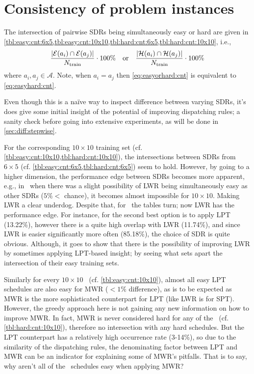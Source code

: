 \section{Consistency of problem instances}
The intersection of pairwise SDRs being simultaneously easy or hard are given in \cref{tbl:easy:cnt:6x5,tbl:easy:cnt:10x10,tbl:hard:cnt:6x5,tbl:hard:cnt:10x10}, i.e., 
\begin{equation}\label{eq:easyorhard:cnt}
	\frac{\abs{\mathcal{E}(a_i)\cap \mathcal{E}(a_j) }}{N_{\text{train}}} \cdot 100\%
	\quad \text{or} \quad 
	\frac{\abs{\mathcal{H}(a_i)\cap \mathcal{H}(a_j)}}{N_{\text{train}}}\cdot 100\%
\end{equation}
where $a_i,a_j\in\mathcal{A}$. Note, when $a_i=a_j$ then \cref{eq:easyorhard:cnt} is equivalent to \cref{eq:easyhard:cnt}.

Even though this is a na\"ive way to inspect difference between varying SDRs, it's does give some initial insight of the potential of improving dispatching rules; a sanity check before going into extensive experiments, as will be done in \cref{sec:diff:stepwise}.

For the corresponding $10\times10$ training set (cf. \cref{tbl:easy:cnt:10x10,tbl:hard:cnt:10x10}), the intersections between SDRs from $6\times5$ (cf. \cref{tbl:easy:cnt:6x5,tbl:hard:cnt:6x5}) seem to hold. 
However, by going to a higher dimension, the performance edge between SDRs becomes more apparent, e.g., in \JSP\ when there was a slight possibility of LWR being simultaneously easy as other SDRs ($5\%<$ chance), it becomes almost impossible for $10\times10$. 
Making LWR a clear underdog. 
Despite that, for \FSP\ the tables turn; now LWR has the performance edge. 
For instance, for  the second  best option is to apply LPT (13.22\%), however there is a quite high overlap with LWR (11.74\%), and since LWR is easier significantly more often (85.18\%), the choice of SDR is quite obvious. 
Although, it goes to show that there is the possibility of improving LWR by sometimes applying LPT-based insight; by seeing what sets apart the intersection of their easy training sets. 

Similarly for every $10\times10$ \JSP\ (cf. \cref{tbl:easy:cnt:10x10}), almost all easy LPT schedules are also easy  for MWR ($<1\%$ difference), as is to be expected as MWR is the more sophisticated counterpart for LPT (like LWR is for SPT). 
However, the greedy approach here is  not gaining any new information on how to improve MWR. 
In fact, MWR is never considered hard for any of the \JSP\ (cf. \cref{tbl:hard:cnt:10x10}), therefore no intersection with any hard schedules. 
But the LPT counterpart has a relatively high occurrence rate (3-14\%), so due to the similarity of the dispatching rules, the denominating factor between LPT and MWR can be an indicator for explaining some of MWR's pitfalls.
That is to say, why aren't all of the \jsp\ schedules easy when applying MWR? 

